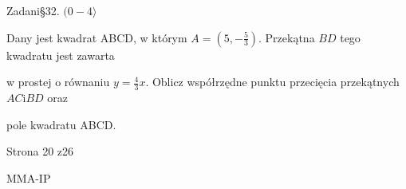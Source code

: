 \documentclass[a4paper,12pt]{article}
\begin{document}
Zadani\S 32. $(0-4\rangle$

Dany jest kwadrat ABCD, w którym $A=(5,-\displaystyle \frac{5}{3})$. Przekątna $BD$ tego kwadratu jest zawarta

w prostej o równaniu $y=\displaystyle \frac{4}{3}x$. Oblicz współrzędne punktu przecięcia przekątnych $AC\mathrm{i}BD$ oraz

pole kwadratu ABCD.

Strona 20 z26

MMA-IP
\end{document}
